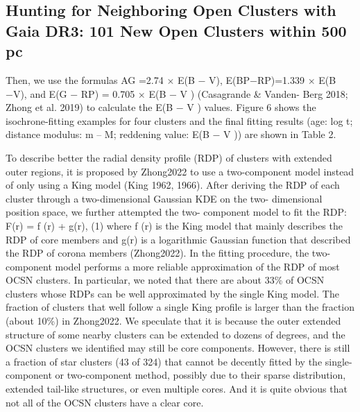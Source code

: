 \documentclass[../main.tex]{subfiles}
\begin{document}
{\subsection{Hunting for Neighboring Open Clusters with Gaia DR3: 101 New Open Clusters within 500 pc} %
Then, we use the formulas AG =2.74 × E(B − V), E(BP−RP)=1.339 × E(B −V), and E(G − RP) = 0.705 × E(B − V ) (Casagrande & Vanden- Berg 2018; Zhong et al. 2019) to calculate the E(B − V ) values. Figure 6 shows the isochrone-fitting examples for four clusters and the final fitting results (age: log t; distance modulus: m – M;
reddening value: E(B − V )) are shown in Table 2.

To describe better the radial density profile (RDP) of clusters with extended outer regions, it is proposed by Zhong2022 to use a two-component model instead of only using a King model (King 1962, 1966). After deriving the RDP of each cluster through a two-dimensional Gaussian KDE on the two- dimensional position space, we further attempted the two- component model to fit the RDP:
F(r) = f (r) + g(r), (1) %
where f (r) is the King model that mainly describes the RDP of core members and g(r) is a logarithmic Gaussian function that described the RDP of corona members (Zhong2022).
In the fitting procedure, the two-component model performs a more reliable approximation of the RDP of most OCSN clusters. In particular, we noted that there are about 33\% of OCSN clusters whose RDPs can be well approximated by the single King model. The fraction of clusters that well follow a single King profile is larger than the fraction (about 10\%) in Zhong2022. We speculate that it is because the outer extended structure of some nearby clusters can be extended to dozens of degrees, and the OCSN clusters we identified may still be core components. However, there is still a fraction of star clusters (43 of 324) that cannot be decently fitted by the single-component or two-component method, possibly due to their sparse distribution, extended tail-like structures, or even multiple cores. And it is quite obvious that not all of the OCSN clusters have a clear core.

}
\end{document}
